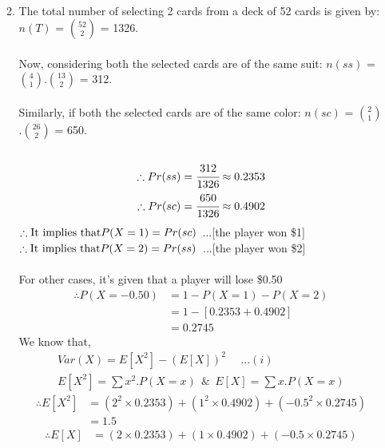 \documentclass{article}
\begin{document}
\begin{enumerate}
\begin{enumerate}
\begin{enumerate}
\[            \]\\
        \end{enumerate}
    \item
        The total number of selecting 2 cards from a deck of 52 cards is given by: \(n(T)\) = \(\binom{52}{2}\) = 1326.\\\\
        Now, considering both the selected cards are of the same suit: \(n(ss)\) = \(\binom{4}{1}\).\(\binom{13}{2}\) = 312.\\\\
        Similarly, if both the selected cards are of the same color: \(n(sc)\) = \(\binom{2}{1}\).\(\binom{26}{2}\) = 650.\\\\
        \begin{align*}
            \therefore Pr(ss) = \cfrac{312}{1326} \approx 0.2353\\
            \therefore Pr(sc) = \cfrac{650}{1326} \approx 0.4902\\
        \end{align*}
        \(\therefore \textnormal{It implies that} P(X=1) = Pr(sc)\)\ ...[the player won \$1]\\
        \(\therefore \textnormal{It implies that} P(X=2) = Pr(ss)\)\ ...[the player won \$2]\\\\
        For other cases, it's given that a player will lose \$0.50
        \begin{align*}
        \therefore P(X= -0.50) &= 1 - P(X=1) - P(X=2)\\
        &= 1- [0.2353 + 0.4902]\\
        &= 0.2745
        \end{align*}
        We know that,
        \begin{align*}
            Var(X) = E[X^2] - (E[X])^2\ \ \ \ \ \ ...(i)\\
            E[X^2] = \sum x^2.P(X=x)\ \ \& \ \ E[X] = \sum x.P(X=x)
        \end{align*}
        \begin{align*}
            \therefore  E[X^2] &= (2^2\times 0.2353) + (1^2\times 0.4902) + (-0.5^2\times 0.2745)\\
            &= 1.5
        \end{align*}
        \begin{align*}
            \therefore  E[X] &= (2\times 0.2353) + (1\times 0.4902) + (-0.5\times 0.2745)\\

\end{align*}
\end{enumerate}
\end{enumerate}
\end{document}
